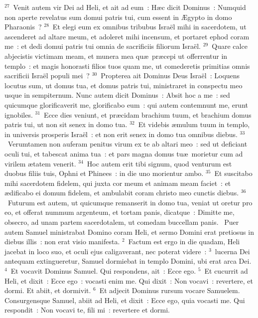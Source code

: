 ${}^{27}$~Venit autem vir Dei ad Heli, et ait ad eum~: H\ae c dicit Dominus~: Numquid non aperte revelatus sum domui patris tui, cum essent in \AE gypto in domo Pharaonis~?
${}^{28}$~Et elegi eum ex omnibus tribubus Isra\"el mihi in sacerdotem, ut ascenderet ad altare meum, et adoleret mihi incensum, et portaret ephod coram me~: et dedi domui patris tui omnia de sacrificiis filiorum Isra\"el.
${}^{29}$~Quare calce abjecistis victimam meam, et munera mea qu\ae\ pr\ae cepi ut offerrentur in templo~: et magis honorasti filios tuos quam me, ut comederetis primitias omnis sacrificii Isra\"el populi mei~?
${}^{30}$~Propterea ait Dominus Deus Isra\"el~: Loquens locutus sum, ut domus tua, et domus patris tui, ministraret in conspectu meo usque in sempiternum. Nunc autem dicit Dominus~: Absit hoc a me~: sed quicumque glorificaverit me, glorificabo eum~: qui autem contemnunt me, erunt ignobiles.
${}^{31}$~Ecce dies veniunt, et pr\ae cidam brachium tuum, et brachium domus patris tui, ut non sit senex in domo tua.
${}^{32}$~Et videbis \ae mulum tuum in templo, in universis prosperis Isra\"el~: et non erit senex in domo tua omnibus diebus.
${}^{33}$~Verumtamen non auferam penitus virum ex te ab altari meo~: sed ut deficiant oculi tui, et tabescat anima tua~: et pars magna domus tu\ae\ morietur cum ad virilem \ae tatem venerit.
${}^{34}$~Hoc autem erit tibi signum, quod venturum est duobus filiis tuis, Ophni et Phinees~: in die uno morientur ambo.
${}^{35}$~Et suscitabo mihi sacerdotem fidelem, qui juxta cor meum et animam meam faciet~: et \ae dificabo ei domum fidelem, et ambulabit coram christo meo cunctis diebus.
${}^{36}$~Futurum est autem, ut quicumque remanserit in domo tua, veniat ut oretur pro eo, et offerat nummum argenteum, et tortam panis, dicatque~: Dimitte me, obsecro, ad unam partem sacerdotalem, ut comedam buccellam panis.
~Puer autem Samuel ministrabat Domino coram Heli, et sermo Domini erat pretiosus in diebus illis~: non erat visio manifesta.
${}^{2}$~Factum est ergo in die quadam, Heli jacebat in loco suo, et oculi ejus caligaverant, nec poterat videre~:
${}^{3}$~lucerna Dei antequam extingueretur, Samuel dormiebat in templo Domini, ubi erat arca Dei.
${}^{4}$~Et vocavit Dominus Samuel. Qui respondens, ait~: Ecce ego.
${}^{5}$~Et cucurrit ad Heli, et dixit~: Ecce ego~: vocasti enim me. Qui dixit~: Non vocavi~: revertere, et dormi. Et abiit, et dormivit.
${}^{6}$~Et adjecit Dominus rursum vocare Samuelem. Consurgensque Samuel, abiit ad Heli, et dixit~: Ecce ego, quia vocasti me. Qui respondit~: Non vocavi te, fili mi~: revertere et dormi.
